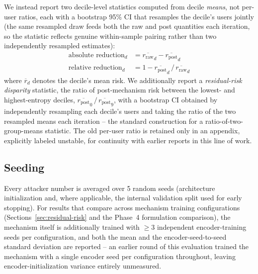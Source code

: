 We instead report two decile-level statistics computed from decile
\emph{means}, not per-user ratios, each with a bootstrap 95\% CI that
resamples the decile's users jointly (the same resampled draw feeds
both the raw and post quantities each iteration, so the statistic
reflects genuine within-sample pairing rather than two independently
resampled estimates):
\begin{align}
\text{absolute reduction}_d &= \overline{r_{\mathrm{raw}}}_d - \overline{r_{\mathrm{post}}}_d \\
\text{relative reduction}_d &= 1 - \overline{r_{\mathrm{post}}}_d \,/\, \overline{r_{\mathrm{raw}}}_d
\end{align}
where $\overline{r}_d$ denotes the decile's mean risk. We additionally
report a \emph{residual-risk disparity} statistic, the ratio of
post-mechanism risk between the lowest- and highest-entropy deciles,
$\overline{r_{\mathrm{post}}}_0 \,/\, \overline{r_{\mathrm{post}}}_9$,
with a bootstrap CI obtained by independently resampling each decile's
users and taking the ratio of the two resampled means each iteration --
the standard construction for a ratio-of-two-group-means statistic. The
old per-user ratio is retained only in an appendix, explicitly labeled
unstable, for continuity with earlier reports in this line of work.

\subsection{Seeding}
\label{sec:seeding}
Every attacker number is averaged over 5 random seeds (architecture
initialization and, where applicable, the internal validation split
used for early stopping). For results that compare across mechanism
training configurations (Sections~\ref{sec:residual-risk} and the
Phase~4 formulation comparison), the mechanism itself is additionally
trained with $\geq 3$ independent encoder-training seeds per
configuration, and both the mean and the encoder-seed-to-seed standard
deviation are reported -- an earlier round of this evaluation trained
the mechanism with a single encoder seed per configuration throughout,
leaving encoder-initialization variance entirely unmeasured.
